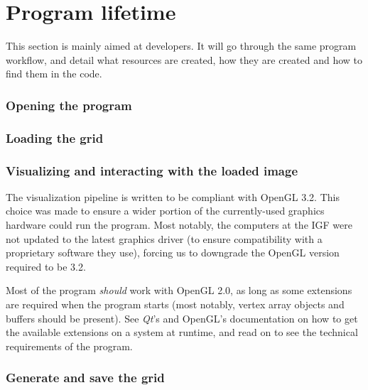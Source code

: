 \section{Program lifetime}\label{text:02_program_flow:02_object_lifetime}
{
	This section is mainly aimed at developers. It will go through the same program workflow, and detail what resources are created, how they are created and how to find them in the code.

	\subsubsection{Opening the program}
	{
	}

	\subsubsection{Loading the grid}
	{
	}

	\subsubsection{Visualizing and interacting with the loaded image}
	{
		The visualization pipeline is written to be compliant with OpenGL 3.2. This choice was made to ensure a wider portion of the currently-used graphics hardware could run the program. Most notably, the computers at the IGF were not updated to the latest graphics driver (to ensure compatibility with a proprietary software they use), forcing us to downgrade the OpenGL version required to be 3.2.\par
		Most of the program \textit{should} work with OpenGL 2.0, as long as some extensions are required when the program starts (most notably, vertex array objects and buffers should be present). See \textit{Qt}'s and OpenGL's documentation on how to get the available extensions on a system at runtime, and read on to see the technical requirements of the program.

	}

	\subsubsection{Generate and save the grid}
	{
	}
}

